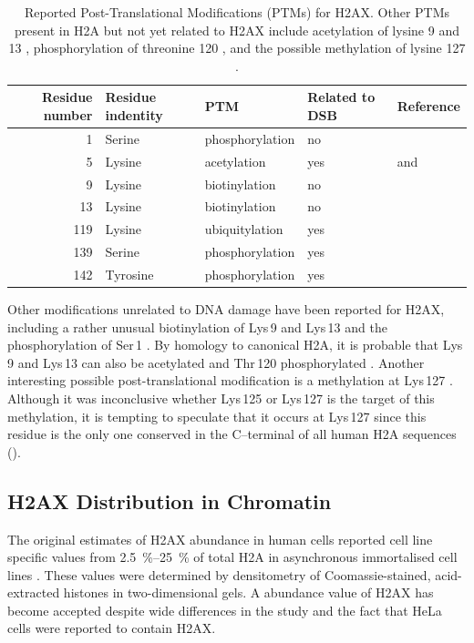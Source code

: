 \begin{table}
\centering
\caption{Reported Post-Translational Modifications (PTMs) for H2AX\@. Other PTMs present in H2A but
not yet related to H2AX include acetylation of lysine 9 and 13 \protect\citep{ZEP+03}, phosphorylation
of threonine 120 \protect\citep{ANY+04}, and the possible methylation of lysine 127 \protect\citep{ZEP+03}.}
\label{tab:h2ax-review:H2AX-PTM}
\begin{tabular}{r l l l l}
\toprule
Residue number & Residue indentity & PTM & Related to DSB  & Reference  \\
\midrule
1   & Serine & phosphorylation & no  & \citet{PB81} \\
5   & Lysine    & acetylation     & yes & \citet{PB81} and \citet{ITK+07} \\
9   & Lysine    & biotinylation   & no  & \citet{CCK+06} \\
13  & Lysine   & biotinylation   & no  & \citet{CCK+06} \\
119 & Lysine  & ubiquitylation  & yes & \citet{ITK+07} \\
139 & Serine  & phosphorylation & yes & \citet{EPR+98} \\
142 & Tyrosine  & phosphorylation & yes & \citet{XLS+09} \\
\bottomrule
\end{tabular}
\end{table}

Other modifications unrelated to DNA damage have been reported for H2AX, including a rather unusual
biotinylation of Lys\,9 and Lys\,13 \citep{CCK+06} and the phosphorylation of Ser\,1 \citep{PB81}. By
homology to canonical H2A, it is probable that Lys\,9 and Lys\,13 can also be acetylated \citep{ZEP+03}
and Thr\,120 phosphorylated \citep{ANY+04}. Another interesting possible post-translational modification
is a methylation at Lys\,127 \citep{ZEP+03}. Although it was inconclusive whether Lys\,125 or Lys\,127
is the target of this methylation, it is tempting to speculate that it occurs at Lys\,127 since this
residue is the only one conserved in the C--terminal of all human H2A sequences ().

\subsection{H2AX Distribution in Chromatin}
\label{subsec:h2ax-review:H2AX-distribution}
The original estimates of H2AX abundance in human cells reported cell line specific values from
\SIrange{2.5}{25}{\percent} of total H2A in asynchronous immortalised cell lines \citep{EPR+98}. These values were
determined by densitometry of Coomassie-stained, acid-extracted histones in two-dimensional gels. A
 abundance value of H2AX has become accepted despite wide differences in the study and the fact
that HeLa cells were reported to contain  H2AX\@.

